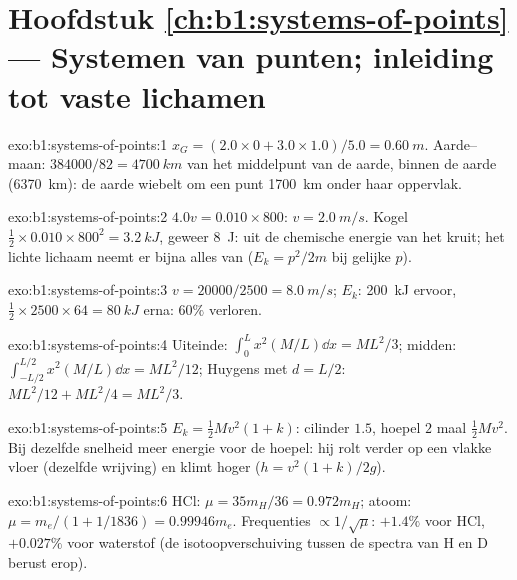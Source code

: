 \section*{Hoofdstuk \ref{ch:b1:systems-of-points} --- Systemen van punten; inleiding tot vaste lichamen}

\begin{solution}{exo:b1:systems-of-points:1}
$x_G = (2.0 \times 0 + 3.0 \times 1.0)/5.0 = \qty{0.60}{m}$. Aarde--maan:
$384000/82 = \qty{4700}{km}$ van het middelpunt van de aarde, binnen de aarde
(\qty{6370}{km}): de aarde wiebelt om een punt \qty{1700}{km} onder
haar oppervlak.
\end{solution}

\begin{solution}{exo:b1:systems-of-points:2}
$4.0v = 0.010 \times 800$: $v = \qty{2.0}{m/s}$. Kogel $\tfrac12 \times 0.010
\times 800^2 = \qty{3.2}{kJ}$, geweer \qty{8}{J}: uit de chemische energie
van het kruit; het lichte lichaam neemt er bijna alles van ($E_k = p^2/2m$
bij gelijke $p$).
\end{solution}

\begin{solution}{exo:b1:systems-of-points:3}
$v = 20000/2500 = \qty{8.0}{m/s}$; $E_k$: \qty{200}{kJ} ervoor, $\tfrac12 \times
2500 \times 64 = \qty{80}{kJ}$ erna: $60\%$ verloren.
\end{solution}

\begin{solution}{exo:b1:systems-of-points:4}
Uiteinde: $\int_0^L x^2(M/L)\dd x = ML^2/3$; midden: $\int_{-L/2}^{L/2}x^2(M/L)
\dd x = ML^2/12$; Huygens met $d = L/2$: $ML^2/12 + ML^2/4 = ML^2/3$.
\end{solution}

\begin{solution}{exo:b1:systems-of-points:5}
$E_k = \tfrac12 Mv^2(1 + k)$: cilinder $1.5$, hoepel $2$ maal $\tfrac12 Mv^2$.
Bij dezelfde snelheid meer energie voor de hoepel: hij rolt verder op een vlakke vloer
(dezelfde wrijving) en klimt hoger ($h = v^2(1 + k)/2g$).
\end{solution}

\begin{solution}{exo:b1:systems-of-points:6}
HCl: $\mu = 35m_H/36 = 0.972m_H$; atoom: $\mu = m_e/(1 + 1/1836) =
0.99946m_e$. Frequenties $\propto 1/\sqrt\mu$: $+1.4\%$ voor HCl, $+0.027\%$
voor waterstof (de isotoopverschuiving tussen de spectra van H en D berust erop).
\end{solution}

